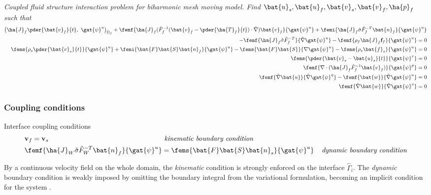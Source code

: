 \begin{prob}
\textit{Coupled fluid structure interaction problem for biharmonic mesh moving model.
Find $\bat{u}_s, \bat{u}_f, \bat{v}_s, \bat{v}_f, \ha{p}_f $ such that}
\begin{align*}
\big(\ha{J}_f \pder{\bat{v}_f}{t}, \ \gat{\psi}^u \big)_{\hat{\Omega}_f} +
\femf{\ha{J}_f (\hat{F}_f^{-1}(\bat{v}_f - \pder{\ha{T}_f}{t}) \cdot \hat{\nabla}) \bat{v}_f}{\gat{\psi}^u}
+ \femi{\ha{J}_f \hat{\sigma}\hat{F}_f^{-T} \bat{n}_f}{\gat{\psi}^u} \\
- \femf{\ha{J}_f \hat{\sigma}\hat{F}_f^{-T}}{\hat{\nabla}\gat{\psi}^u} -
\femf{\rho_f \ha{J}_f \mathbf{f}_f}{{\gat{\psi}^u}} = 0 \\
\fems{\rho_s \pder{\bat{v}_s}{t}}{\gat{\psi}^u} + \femi{\bat{F}\bat{S}\bat{n}_f}{\gat{\psi}^u}
- \fems{\bat{F}\bat{S}}{\nabla \gat{\psi}^u} - \fems{\rho_s \bat{f}_s}{\gat{\psi}^u} = 0 \\
\fems{\pder{\bat{v}_s - \bat{u}_s}{t}}{\gat{\psi}^v}  = 0\\
\femf{\nabla \cdot (\ha{J}_f \hat{F}_f^{-1} \bat{v}_f)}{\gat{\psi}^p} = 0 \\
\femf{\hat{\nabla}\bat{u}}{\hat{\nabla}\gat{\psi}^{\eta}} - 
\femf{\bat{w}}{\hat{\nabla}\gat{\psi}^u} = 0 \\
\femf{\hat{\nabla}\bat{w}}{\hat{\nabla}\gat{\psi}^{v}} = 0
\end{align*}
\end{prob}

\subsubsection*{Coupling conditions}

\begin{equat}
Interface coupling conditions
\begin{align*}
&\mathbf{v}_f = \mathbf{v}_s  \hspace{5.9cm} \textit{kinematic boundary condition} \\
& \femf{\ha{J}_W \hat{\sigma}\hat{F}_W^{-T} \bat{n}_f}{\gat{\psi}^u} = 
 \fems{\bat{F}\bat{S} \bat{n}_s}{\gat{\psi}^u}  \hspace{4mm} \textit{dynamic boundary condition} 
\end{align*} 
\end{equat}
By a continuous velocity field on the whole domain, the \textit{kinematic} condition is strongly enforced on the interface $\hat{\Gamma}_i$.
The \textit{dynamic} boundary condition is  weakly imposed by omitting the boundary integral from the variational formulation, becoming an implicit condition for the system  \cite{Wick}. \\

